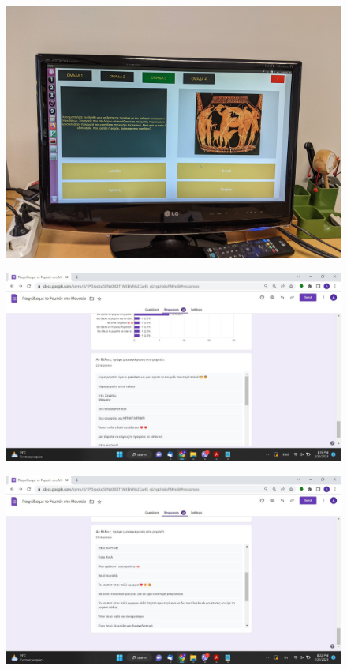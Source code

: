 \begin{figure}[H]\centering
  \includegraphics[scale=0.1]{./figures/parts/appendix/chapters/06/mouseio_1.jpg}
\end{figure}
\begin{figure}[H]\centering
  \includegraphics[scale=0.4]{./figures/parts/appendix/chapters/06/indy_kids_1.jpg}
\end{figure}
\begin{figure}[H]\centering
  \includegraphics[scale=0.4]{./figures/parts/appendix/chapters/06/indy_kids_2.jpg}
\end{figure}
